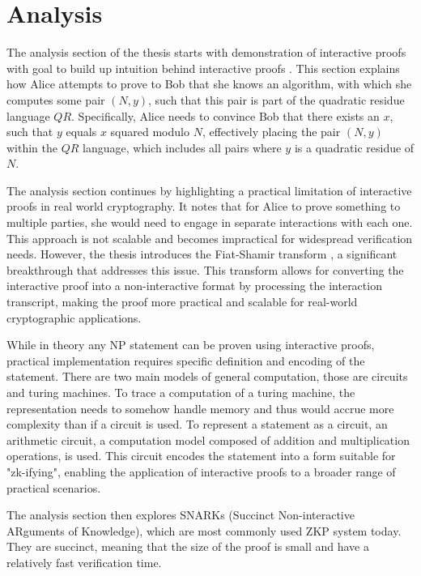 \chapter{Analysis}\label{chapter:analysis}

The analysis section of the thesis starts with demonstration of interactive
proofs with goal to build up intuition behind interactive proofs \cite{Goldwasser1989,youtubeMOOCLecture1}.
This section explains how Alice attempts to prove to Bob that she knows an
algorithm, with which she computes some pair $(N, y)$, such that this pair is
part of the quadratic residue language $QR$. Specifically, Alice needs to
convince Bob that there exists an $x$, such that $y$ equals $x$ squared modulo $N$,
effectively placing the pair $(N, y)$ within the $QR$ language, which includes all
pairs where $y$ is a quadratic residue of $N$.

The analysis section continues by highlighting a practical limitation of
interactive proofs in real world cryptography. It notes that for Alice to
prove something to multiple parties, she would need to engage in separate
interactions with each one. This approach is not scalable and becomes
impractical for widespread verification needs. However, the thesis introduces
the Fiat-Shamir transform \cite{Fiat}, a significant breakthrough that addresses this
issue. This transform allows for converting the interactive proof into a
non-interactive format by processing the interaction transcript, making the
proof more practical and scalable for real-world cryptographic applications.

While in theory any NP statement \cite{goldreich1991proofs} can be proven using
interactive proofs, practical implementation requires specific definition and
encoding of the statement. There are two main models of general computation,
those are circuits and turing machines. To trace a computation of a turing
machine, the representation needs to somehow handle memory and thus would accrue
more complexity than if a circuit is used. To represent a statement as a
circuit, an arithmetic circuit, a computation model composed of addition and
multiplication operations, is used. This circuit encodes the statement into a
form suitable for "zk-ifying", enabling the application of interactive proofs
to a broader range of practical scenarios.

The analysis section then explores SNARKs (Succinct Non-interactive ARguments
of Knowledge), which are most commonly used ZKP system today. They are succinct,
meaning that the size of the proof is small and have a relatively fast verification
time.

